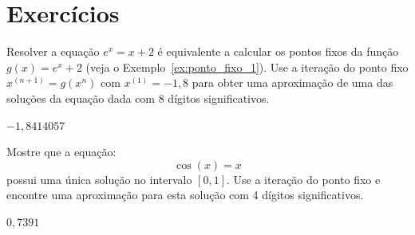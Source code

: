 \section*{Exercícios}

\begin{Exercise}
  Resolver a equação $e^x = x + 2$ é equivalente a calcular os pontos fixos da função $g(x) = e^x + 2$ (veja o Exemplo~\ref{ex:ponto_fixo_1}). Use a iteração do ponto fixo $x^{(n+1)} = g(x^{n})$ com $x^{(1)} = -1,8$ para obter uma aproximação de uma das soluções da equação dada com $8$ dígitos significativos.
\end{Exercise}
\begin{Answer}
  \begin{tiny}
    $-1,8414057$
  \end{tiny}
\end{Answer}

\begin{Exercise}  Mostre que a equação:
  \begin{equation*}
    \cos(x)=x  
  \end{equation*}
possui uma única solução no intervalo $[0, 1]$. Use a iteração do ponto fixo e encontre uma aproximação para esta solução com  4 dígitos significativos.
\end{Exercise}
\begin{Answer}
  \begin{tiny}
    $0,7391$
  \end{tiny}
\end{Answer}

